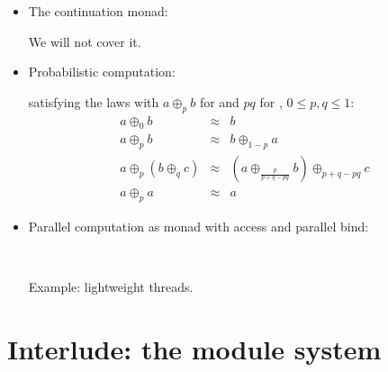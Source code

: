 \documentclass{beamer}
\newcommand{\tmverbatim}[1]{\text{{\ttfamily{#1}}}}
\begin{document}
\begin{itemize}
\begin{itemize}
    {}{\hlopt{: }}{}{\hlopt{-> }}{}{}
    
    \item The continuation monad:
    
    {}{\hlopt{: ((}}{}{\hlopt{-> }}{}{\hlopt{) -> }}{}{\hlopt{) -> }}{}{\hlendline{}}
    
    We will not cover it.
    
    \item Probabilistic computation:
    
    {}{\hlopt{: }}{}{\hlopt{-> }}{}{\hlopt{-> }}{}{\hlopt{-> }}{}
    
    satisfying the laws with $a \oplus_p b$ for \tmverbatim{choose p a b} and
    $pq$ for \tmverbatim{p*.q}, $0 \leqslant p, q \leqslant 1$:
    \begin{eqnarray*}
      a \oplus_0 b & \approx & b\\
      a \oplus_p b & \approx & b \oplus_{1 - p} a\\
      a \oplus_p (b \oplus_q c) & \approx & \left( a \oplus_{\frac{p}{p + q -
      pq}} b \right) \oplus_{p + q - pq} c\\
      a \oplus_p a & \approx & a
    \end{eqnarray*}
    \item Parallel computation as monad with access and parallel bind:
    
    {}{\hlopt{:}}{\hlendline{}}\\
    {}{\hlopt{-> }}{}{\hlopt{-> (}}{}{\hlopt{-> }}{}{\hlopt{-> }}{}{\hlopt{) ->
    }}{}
    
    Example: lightweight threads.
  \end{itemize}
\end{itemize}

\section{Interlude: the module system}
\end{document}
